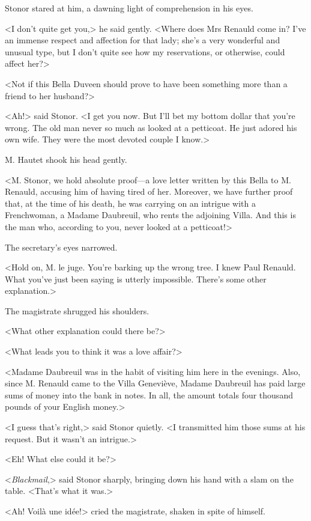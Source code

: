  Stonor stared at him, a dawning light of comprehension in his eyes. 

 <I don't quite get you,> he said gently. <Where does Mrs Renauld come in? I've an immense respect and affection for that lady; she's a very wonderful and unusual type, but I don't quite see how my reservations, or otherwise, could affect her?> 

 <Not if this Bella Duveen should prove to have been something more than a friend to her husband?> 

 <Ah!> said Stonor. <I get you now. But I'll bet my bottom dollar that you're wrong. The old man never so much as looked at a petticoat. He just adored his own wife. They were the most devoted couple I know.> 

 M. Hautet shook his head gently. 

 <M. Stonor, we hold absolute proof—a love letter written by this Bella to M. Renauld, accusing him of having tired of her. Moreover, we have further proof that, at the time of his death, he was carrying on an intrigue with a Frenchwoman, a Madame Daubreuil, who rents the adjoining Villa. And this is the man who, according to you, never looked at a petticoat!> 

 The secretary's eyes narrowed. 

 <Hold on, M. le juge. You're barking up the wrong tree. I knew Paul Renauld. What you've just been saying is utterly impossible. There's some other explanation.> 

 The magistrate shrugged his shoulders. 

 <What other explanation could there be?> 

 <What leads you to think it was a love affair?> 

 <Madame Daubreuil was in the habit of visiting him here in the evenings. Also, since M. Renauld came to the Villa Geneviève, Madame Daubreuil has paid large sums of money into the bank in notes. In all, the amount totals four thousand pounds of your English money.> 

 <I guess that's right,> said Stonor quietly. <I transmitted him those sums at his request. But it wasn't an intrigue.> 

 <Eh!  What else could it be?> 

 <\emph{Blackmail},> said Stonor sharply, bringing down his hand with a slam on the table. <That's what it was.> 

 <Ah! Voilà une idée!> cried the magistrate, shaken in spite of himself. 

